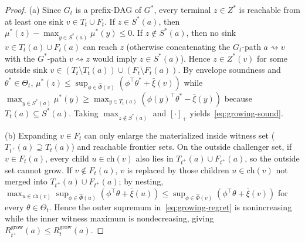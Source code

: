 \documentclass{article}
\theoremstyle{plain}
\theoremstyle{definition}
\begin{document}
\begin{proof}
(a) Since $G_t$ is a prefix-DAG of $G^*$, every terminal $z \in Z^*$ is reachable from at least one sink $v \in T_t \cup F_t$. If $z \in S^*(a)$, then $\mu^*(z) - \max_{y \in S^*(a)} \mu^*(y) \le 0$. If $z \notin S^*(a)$, then no sink $v \in T_t(a) \cup F_t(a)$ can reach $z$ (otherwise concatenating the $G_t$-path $a \rightsquigarrow v$ with the $G^*$-path $v \rightsquigarrow z$ would imply $z \in S^*(a)$). Hence $z \in Z^*(v)$ for some outside sink $v \in (T_t \setminus T_t(a)) \cup (F_t \setminus F_t(a))$. By envelope soundness and $\theta^* \in \Theta_t$, $\mu^*(z) \le \sup_{\phi \in \widehat\Phi(v)} (\phi^\top \theta^* + \bar\xi(v))$ while $\max_{y \in S^*(a)} \mu^*(y) \ge \max_{y \in T_t(a)} (\phi(y)^\top \theta^* - \bar\xi(y))$ because $T_t(a) \subseteq S^*(a)$. Taking $\max_{z \notin S^*(a)}$ and $[\cdot]_+$ yields~\eqref{eq:growing-sound}.

(b) Expanding $v \in F_t$ can only enlarge the materialized inside witness set ($T_{t^+}(a) \supseteq T_t(a)$) and reachable frontier sets. On the outside challenger set, if $v \in F_t(a)$, every child $u \in \mathrm{ch}(v)$ also lies in $T_{t^+}(a) \cup F_{t^+}(a)$, so the outside set cannot grow. If $v \notin F_t(a)$, $v$ is replaced by those children $u \in \mathrm{ch}(v)$ not merged into $T_{t^+}(a) \cup F_{t^+}(a)$; by nesting, $\max_{u \in \mathrm{ch}(v)} \sup_{\phi \in \widehat\Phi(u)} (\phi^\top \theta + \bar\xi(u)) \le \sup_{\phi \in \widehat\Phi(v)} (\phi^\top \theta + \bar\xi(v))$ for every $\theta \in \Theta_t$. Hence the outer supremum in~\eqref{eq:growing-regret} is nonincreasing while the inner witness maximum is nondecreasing, giving $R_{t^+}^{\mathrm{grow}}(a) \le R_t^{\mathrm{grow}}(a)$.
\end{proof}
\end{document}
